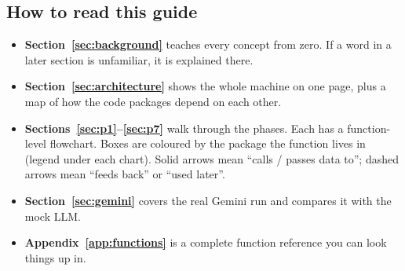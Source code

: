 \subsection{How to read this guide}

\begin{itemize}
  \item \textbf{Section~\ref{sec:background}} teaches every concept from zero. If a word in a later section is
        unfamiliar, it is explained there.
  \item \textbf{Section~\ref{sec:architecture}} shows the whole machine on one page, plus a map of how the code
        packages depend on each other.
  \item \textbf{Sections~\ref{sec:p1}--\ref{sec:p7}} walk through the phases. Each has a function-level flowchart.
        Boxes are coloured by the package the function lives in (legend under each chart). Solid arrows mean
        ``calls / passes data to''; dashed arrows mean ``feeds back'' or ``used later''.
  \item \textbf{Section~\ref{sec:gemini}} covers the real Gemini run and compares it with the mock LLM.
  \item \textbf{Appendix~\ref{app:functions}} is a complete function reference you can look things up in.
\end{itemize}
